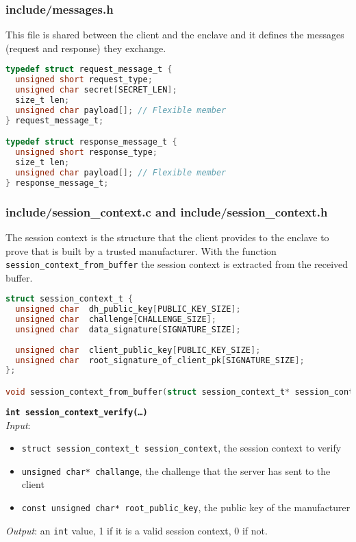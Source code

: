 \subsubsection{include/messages.h}
This file is shared between the client and the enclave and it defines the messages (request and response) they exchange. \\
\begin{lstlisting}[language=C,frame=single]
typedef struct request_message_t {
  unsigned short request_type;
  unsigned char secret[SECRET_LEN];
  size_t len;
  unsigned char payload[]; // Flexible member
} request_message_t;

typedef struct response_message_t {
  unsigned short response_type;
  size_t len;
  unsigned char payload[]; // Flexible member
} response_message_t;
\end{lstlisting}

\subsubsection{include/session\_context.c and include/session\_context.h}
The session context is the structure that the client provides to the enclave to prove that is built by a trusted manufacturer. With the function \texttt{session\_context\_from\_buffer} the session context is extracted from the received buffer. \\
\begin{lstlisting}[language=C,frame=single]
struct session_context_t {
  unsigned char  dh_public_key[PUBLIC_KEY_SIZE];
  unsigned char  challenge[CHALLENGE_SIZE];
  unsigned char  data_signature[SIGNATURE_SIZE];
  
  unsigned char  client_public_key[PUBLIC_KEY_SIZE];
  unsigned char  root_signature_of_client_pk[SIGNATURE_SIZE];
};

void session_context_from_buffer(struct session_context_t* session_context, unsigned char* buffer);
\end{lstlisting}

\noindent
\texttt{\bfseries int session\_context\_verify(\dots)}\\
\textit{Input}:
\begin{itemize}[noitemsep,nolistsep]
  \item \texttt{struct session\_context\_t session\_context}, the session context to verify
  \item \texttt{unsigned char* challange}, the challenge that the server has sent to the client
  \item \texttt{const unsigned char* root\_public\_key}, the public key of the manufacturer
\end{itemize}
\textit{Output}: an \texttt{int} value, 1 if it is a valid session context, 0 if not.


